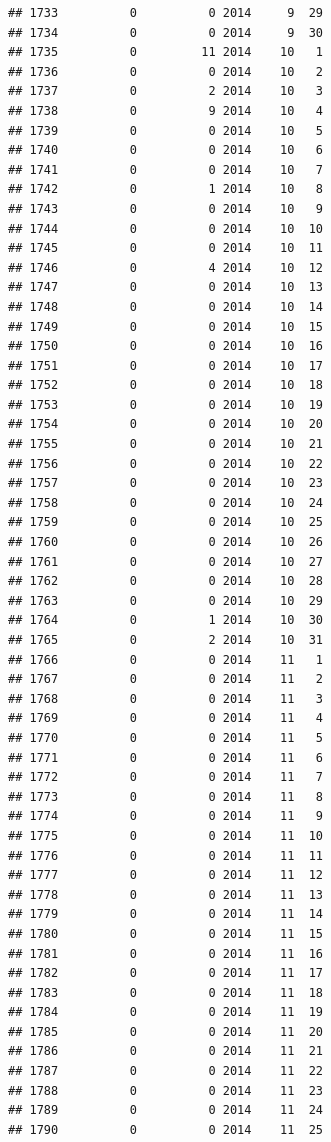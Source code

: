 \documentclass[
]{article}
\begin{document}
\begin{verbatim}
## 1733          0          0 2014     9  29
## 1734          0          0 2014     9  30
## 1735          0         11 2014    10   1
## 1736          0          0 2014    10   2
## 1737          0          2 2014    10   3
## 1738          0          9 2014    10   4
## 1739          0          0 2014    10   5
## 1740          0          0 2014    10   6
## 1741          0          0 2014    10   7
## 1742          0          1 2014    10   8
## 1743          0          0 2014    10   9
## 1744          0          0 2014    10  10
## 1745          0          0 2014    10  11
## 1746          0          4 2014    10  12
## 1747          0          0 2014    10  13
## 1748          0          0 2014    10  14
## 1749          0          0 2014    10  15
## 1750          0          0 2014    10  16
## 1751          0          0 2014    10  17
## 1752          0          0 2014    10  18
## 1753          0          0 2014    10  19
## 1754          0          0 2014    10  20
## 1755          0          0 2014    10  21
## 1756          0          0 2014    10  22
## 1757          0          0 2014    10  23
## 1758          0          0 2014    10  24
## 1759          0          0 2014    10  25
## 1760          0          0 2014    10  26
## 1761          0          0 2014    10  27
## 1762          0          0 2014    10  28
## 1763          0          0 2014    10  29
## 1764          0          1 2014    10  30
## 1765          0          2 2014    10  31
## 1766          0          0 2014    11   1
## 1767          0          0 2014    11   2
## 1768          0          0 2014    11   3
## 1769          0          0 2014    11   4
## 1770          0          0 2014    11   5
## 1771          0          0 2014    11   6
## 1772          0          0 2014    11   7
## 1773          0          0 2014    11   8
## 1774          0          0 2014    11   9
## 1775          0          0 2014    11  10
## 1776          0          0 2014    11  11
## 1777          0          0 2014    11  12
## 1778          0          0 2014    11  13
## 1779          0          0 2014    11  14
## 1780          0          0 2014    11  15
## 1781          0          0 2014    11  16
## 1782          0          0 2014    11  17
## 1783          0          0 2014    11  18
## 1784          0          0 2014    11  19
## 1785          0          0 2014    11  20
## 1786          0          0 2014    11  21
## 1787          0          0 2014    11  22
## 1788          0          0 2014    11  23
## 1789          0          0 2014    11  24
## 1790          0          0 2014    11  25

\end{verbatim}
\end{document}
